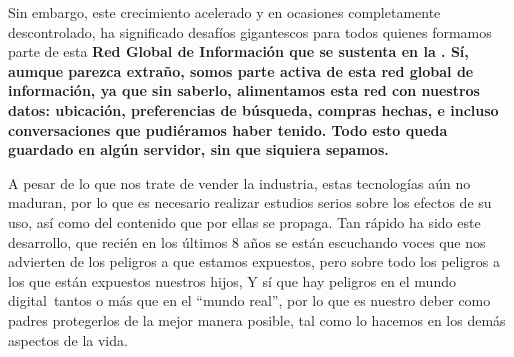 Sin embargo, este crecimiento acelerado y en ocasiones completamente
descontrolado, ha significado desaf\'ios gigantescos para todos quienes
formamos parte de esta \bf{Red Global de Informaci\'on} que se sustenta
en la \internet.  S\'i, aumque parezca extra\~no, somos parte activa
de esta red global de informaci\'on, ya que sin saberlo, alimentamos
esta red con nuestros datos: ubicaci\'on, preferencias de b\'usqueda,
compras hechas, e incluso conversaciones que pudi\'eramos haber tenido.
Todo esto queda guardado en alg\'un servidor, sin que siquiera sepamos.

% 
% 
% 
% 


A pesar de lo que nos trate de vender la industria, estas tecnolog\'ias
a\'un no maduran, 
por lo que es necesario realizar estudios serios 
sobre los efectos de su uso, 
as\'i como del contenido que por ellas se propaga.
Tan r\'apido ha sido este desarrollo, que
reci\'en en los \'ultimos 8 a\~nos se est\'an escuchando voces que
nos advierten de los peligros a que estamos expuestos, pero sobre todo
los peligros a los que est\'an expuestos nuestros hijos, \oxm Y s\'i que hay peligros en el mundo digital\cxm\
tantos o m\'as que en el ``mundo real'',
por lo que es nuestro deber como padres protegerlos de la mejor manera posible, tal
como lo hacemos en los dem\'as aspectos de la vida.

